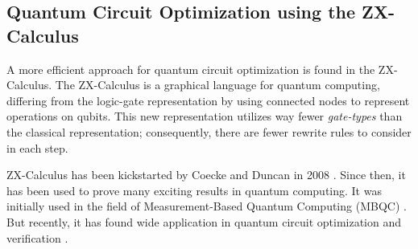 \subsection{Quantum Circuit Optimization using the ZX-Calculus}

A more efficient approach for quantum circuit optimization is found in the ZX-Calculus. The ZX-Calculus is a graphical language for quantum computing, differing from the logic-gate representation by using connected nodes to represent operations on qubits. This new representation utilizes way fewer \textit{gate-types} than the classical representation; consequently, there are fewer rewrite rules to consider in each step.

ZX-Calculus has been kickstarted by Coecke and Duncan in 2008 \cite{Coecke2007graphicalcalculus}. Since then, it has been used to prove many exciting results in quantum computing. It was initially used in the field of Measurement-Based Quantum Computing (MBQC) \cite{duncan2012graphical}. But recently, it has found wide application in quantum circuit optimization and verification \cite{vandewetering2020zxcalculus}.
